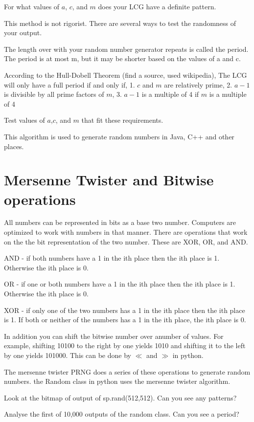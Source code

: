 \begin{problem}
For what values of $a$, $c$, and $m$ does your LCG have a definite pattern.
\end{problem}

This method is not rigorist. There are several ways to test the randomness of your output. 

The length over with your random number generator repeats is called the period. The period is at most m, but it may be shorter based on the values of a and c.
 
According to the Hull-Dobell Theorem (find a source, used wikipedia), The LCG will only have a full period if and only if, 
1. $c$ and $m$ are relatively prime,
2. $a-1$ is divisible by all prime factors of $m$,
3. $a-1$ is a multiple of 4 if $m$ is a multiple of 4

\begin{problem}
Test values of $a$,$c$, and $m$ that fit these requirements. 
\end{problem}

This algorithm is used to generate random numbers in Java, C++ and other places.

\section*{Mersenne Twister and Bitwise operations}


All numbers can be represented in bits as a base two number. Computers are optimized to work with numbers in that manner. There are operations that work on the the bit representation of the two number. These are XOR, OR, and AND. 

AND - if both numbers have a 1 in the ith place then the ith place is 1. Otherwise the ith place is 0.

OR - if one or both numbers have a 1 in the ith place then the ith place is 1. Otherwise the ith place is 0.

XOR - if only one of the two numbers has a 1 in the ith place then the ith place is 1. If both or neither of the numbers has a 1 in the ith place, the ith place is 0.

In addition you can shift the bitwise number over anumber of values. For example, shifting 10100 to the right by one yields 1010 and shifting it to the left by one yields 101000. This can be done by $\ll$ and $\gg$ in python. 


The mersenne twister PRNG does a series of these operations to generate random numbers. the Random class in python uses the mersenne twister algorithm. 

\begin{problem}
Look at the bitmap of output of sp.rand(512,512). Can you see any patterns?
\end{problem}

\begin{problem}
Analyse the first of 10,000 outputs of the random class. Can you see a period?
\end{problem}
